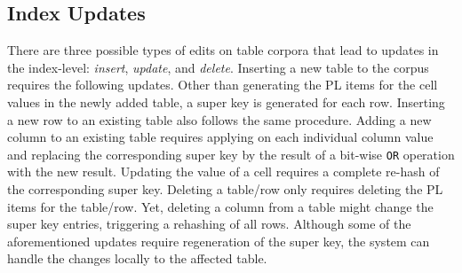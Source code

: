 \subsection{Index Updates}
There are three possible types of edits on table corpora that lead to updates in the index-level: {\em insert}, {\em update}, and {\em delete}.
Inserting a new table to the corpus requires the following updates.
Other than generating the PL items for the cell values in the newly added table, a super key is generated for each row. 
Inserting a new row to an existing table also follows the same procedure. 
Adding a new column to an existing table requires applying \hash on each individual column value and replacing the corresponding super key by the result of a bit-wise \texttt{OR} operation with the new \hash result.
Updating the value of a cell requires a complete re-hash of the corresponding super key.
Deleting a table/row only requires deleting the PL items for the table/row.
Yet, deleting a column from a table might change the super key entries, triggering a rehashing of all rows.
Although some of the aforementioned updates require regeneration of the super key, the system can handle the changes locally to the affected table.
